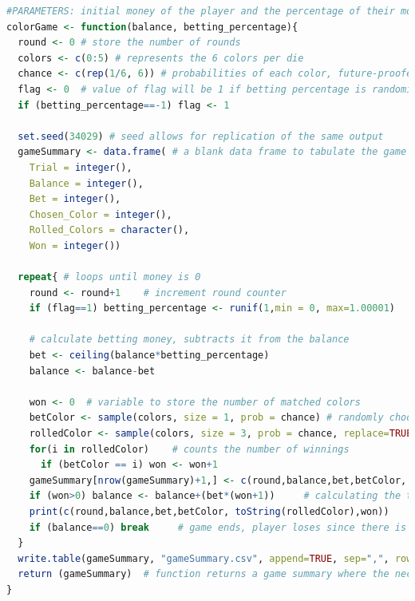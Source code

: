 \documentclass[12pt,letterpaper]{article}
\begin{document}
\begin{enumerate}[label=\Alph*]
\begin{lstlisting}[language=R]
#PARAMETERS: initial money of the player and the percentage of their money they are willing to bet. betting percentage can be -1, randomize betting percentage for every round
colorGame <- function(balance, betting_percentage){
  round <- 0 # store the number of rounds
  colors <- c(0:5) # represents the 6 colors per die
  chance <- c(rep(1/6, 6)) # probabilities of each color, future-proofed in case of biased die
  flag <- 0  # value of flag will be 1 if betting percentage is randomized, else 0
  if (betting_percentage==-1) flag <- 1
  
  set.seed(34029) # seed allows for replication of the same output
  gameSummary <- data.frame( # a blank data frame to tabulate the game summary
    Trial = integer(),
    Balance = integer(),
    Bet = integer(),
    Chosen_Color = integer(),
    Rolled_Colors = character(),
    Won = integer()) 
    
  repeat{ # loops until money is 0
    round <- round+1	# increment round counter
    if (flag==1) betting_percentage <- runif(1,min = 0, max=1.00001)    # randomize betting percentage if player decides to randomize
    
    # calculate betting money, subtracts it from the balance
    bet <- ceiling(balance*betting_percentage)
    balance <- balance-bet
    
    won <- 0  # variable to store the number of matched colors   
    betColor <- sample(colors, size = 1, prob = chance) # randomly choose a color among the 6 colors 
    rolledColor <- sample(colors, size = 3, prob = chance, replace=TRUE) # 1 color per die (3 dice in total) is randomly selected with replacement
    for(i in rolledColor)    # counts the number of winnings
      if (betColor == i) won <- won+1 
    gameSummary[nrow(gameSummary)+1,] <- c(round,balance,bet,betColor, toString(rolledColor),won)    # update gameSummary with new data from this round
    if (won>0) balance <- balance+(bet*(won+1))     # calculating the total money after the round 
    print(c(round,balance,bet,betColor, toString(rolledColor),won))    # for debugging purposes
    if (balance==0) break     # game ends, player loses since there is no money left
  }
  write.table(gameSummary, "gameSummary.csv", append=TRUE, sep=",", row.names = FALSE)  # write a csv file that records the information per round of the color game
  return (gameSummary)  # function returns a game summary where the necessary information about this game is tabulated
}


\end{lstlisting}
\end{enumerate}
\end{document}
